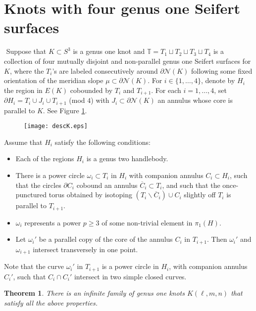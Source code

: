 \documentclass[12pt]{amsart}
\newtheorem{teo}{Theorem}
\begin{document}
\section{Knots with four genus one Seifert surfaces}\label{ejemplos}
\(\)
Suppose that $K\subset S^3$ is a genus one knot and $\mathbb{T}=T_1\sqcup T_2\sqcup T_3\sqcup T_4$ is a collection of four mutually disjoint and non-parallel genus one Seifert surfaces for $K$, where the $T_i$'s are labeled consecutively around $\partial\mathcal{N}(K)$ following some fixed orientation of the meridian slope $\mu\subset\partial\mathcal{N}(K)$. 
For $i\in\{1,\ldots, 4\}$, denote by $H_i$ the region in $E(K)$ cobounded by $T_i$ and $T_{i+1}$.
For each $i=1,\ldots, 4$, set $\partial H_i=T_i\cup {J_i}\cup T_{i+1}$ (mod $4$) with $J_i\subset\partial\mathcal{N}(K)$ an annulus whose core is parallel to $K$. See Figure \ref{descK}.


\begin{figure}
\begin{center}
\texttt{[image: descK.eps]}    
\end{center}
\caption{}
\label{descK}

\end{figure}


Assume that  $H_i$ satisfy the following conditions:

\begin{itemize}
    \item Each of the regions $H_i$ is a genus two handlebody.
    \item There is a power circle $\omega_i\subset T_i$ in $H_i$ with companion annulus $C_i\subset H_i$, such that the circles $\partial C_i$ cobound an annulus $\overline {C}_i\subset T_i$, and such that the once-punctured torus obtained by  isotoping $(T_i\backslash \overline{C}_i)\cup C_i$ slightly off $T_i$ is parallel to $T_{i+1}$. 
    \item $\omega_i$ represents a power $p\geq 3$ of some non-trivial element in $\pi_{1}(H)$.
    \item Let $\omega_i'$ be a parallel copy of the core of the annulus $C_i$ in $T_{i+1}$. Then $\omega_i'$ and $\omega_{i+1}$ intersect transversely in one point.
\end{itemize}

Note that the curve $\omega_i'$ in $T_{i+1}$ is a power circle in $H_i$, with companion annulus $C_i'$, such that $C_i\cap C_i'$ intersect in two simple closed curves.

\begin{teo} \label{familyknots} There is an infinite family of genus one knots $K(\ell,m,n)$ that satisfy all the above properties. \end{teo}
\end{document}

